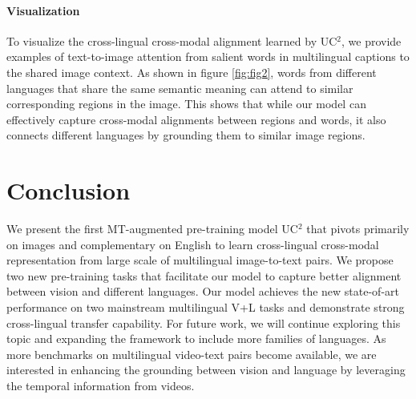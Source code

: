 \documentclass[final]{cvpr}
\newcommand{\jj}[1]{\textcolor{red}{\small{\bf [JJ: #1 ]}}}
\newcommand{\mingyang}[1]{\textcolor{brown}{\small{\bf [Mingyang: #1 ]}}}
\begin{document}

\paragraph{Visualization} To visualize the  cross-lingual cross-modal alignment learned by UC$^2$, we provide examples of text-to-image attention from salient words in multilingual captions to the shared image context. As shown in figure \ref{fig:fig2}, words from different languages that share the same semantic meaning can attend to similar corresponding regions in the image. This shows that while our model can effectively capture cross-modal alignments between regions and words, it also connects different languages by grounding them to similar image regions. 

\section{Conclusion}
We present the first MT-augmented pre-training model UC$^2$ that pivots primarily on images and complementary on English to learn cross-lingual cross-modal representation from large scale of multilingual image-to-text pairs. We propose two new pre-training tasks that facilitate our model to capture better alignment between vision and different languages. Our model achieves the new state-of-art performance on two  mainstream multilingual V+L tasks and demonstrate strong cross-lingual transfer capability. %
For future work, we will continue exploring this topic and expanding the framework to include more families of languages. As more benchmarks \cite{Wang_2019_ICCV, HOW2,bagher-zadeh-etal-2020-cmu} on multilingual video-text pairs become available, we are interested in enhancing the grounding between vision and language by leveraging the temporal information from videos. 
\end{document}

